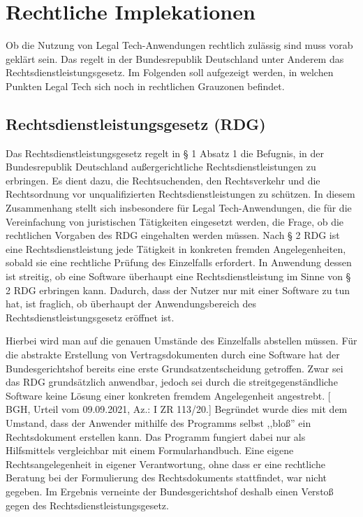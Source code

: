 \chapter{Rechtliche Implekationen}
Ob die Nutzung von Legal Tech-Anwendungen rechtlich zulässig sind muss vorab geklärt sein. Das regelt in der Bundesrepublik Deutschland unter Anderem das Rechtsdienstleistungsgesetz. Im Folgenden soll aufgezeigt werden, in welchen Punkten Legal Tech sich noch in rechtlichen Grauzonen befindet. 

\section{Rechtsdienstleistungsgesetz (RDG)}
Das Rechtsdienstleistungsgesetz regelt in § 1 Absatz 1 die Befugnis, in der Bundesrepublik Deutschland außergerichtliche Rechtsdienstleistungen zu erbringen. Es dient dazu, die Rechtsuchenden, den Rechtsverkehr und die Rechtsordnung vor unqualifizierten Rechtsdienstleistungen zu schützen. In diesem Zusammenhang stellt sich insbesondere für Legal Tech-Anwendungen, die für die Vereinfachung von juristischen Tätigkeiten eingesetzt werden, die Frage, ob die rechtlichen Vorgaben des RDG eingehalten werden müssen. Nach § 2 RDG ist eine Rechtsdienstleistung jede Tätigkeit in konkreten fremden Angelegenheiten, sobald sie eine rechtliche Prüfung des Einzelfalls erfordert. In Anwendung dessen ist streitig, ob eine Software überhaupt eine Rechtsdienstleistung im Sinne von § 2 RDG erbringen kann. Dadurch, dass der Nutzer nur mit einer Software zu tun hat, ist fraglich, ob überhaupt der Anwendungsbereich des Rechtsdienstleistungsgesetz eröffnet ist.

Hierbei wird man auf die genauen Umstände des Einzelfalls abstellen müssen. Für die abstrakte Erstellung von Vertragsdokumenten durch eine Software hat der Bundesgerichtshof bereits eine erste Grundsatzentscheidung getroffen. Zwar sei das RDG grundsätzlich anwendbar, jedoch sei durch die streitgegenständliche Software keine Lösung einer konkreten fremdem Angelegenheit angestrebt. [ BGH, Urteil vom 09.09.2021, Az.: I ZR 113/20.] Begründet wurde dies mit dem Umstand, dass der Anwender mithilfe des Programms selbst ,,bloß'' ein Rechtsdokument erstellen kann. Das Programm fungiert dabei nur als Hilfsmittels vergleichbar mit einem Formularhandbuch. Eine eigene Rechtsangelegenheit in eigener Verantwortung, ohne dass er eine rechtliche Beratung bei der Formulierung des Rechtsdokuments stattfindet, war nicht gegeben. Im Ergebnis verneinte der Bundesgerichtshof deshalb einen Verstoß gegen des Rechtsdienstleistungsgesetz.

